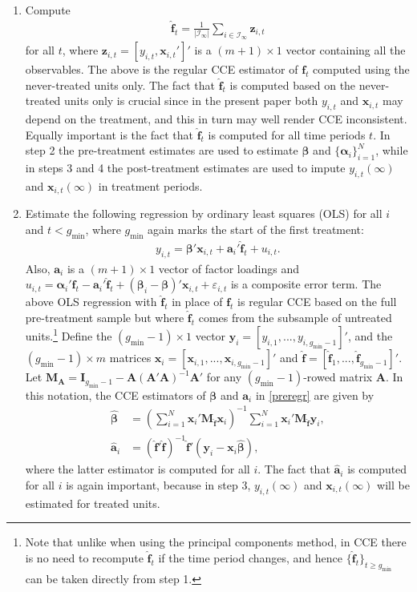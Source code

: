 \documentclass[12pt,fleqn]{article}
\def\*#1{\mathbf{#1}}
\def\+#1{\boldsymbol{#1}}
\begin{document}
\begin{enumerate}
\item Compute
\begin{align}
\widehat{\*f}_t = \frac{1}{|\mathcal{I}_\infty|}\sum_{i \in \mathcal{I}_\infty} \*z_{i,t}  \label{fhat}
\end{align}
for all $t$, where $\*z_{i,t} = [y_{i,t},\*x_{i,t}']'$ is a $(m+1)\times 1$ vector containing all the observables. The above is the regular CCE estimator of $\*f_t$ computed using the never-treated units only. The fact that $\widehat{\*f}_t$ is computed based on the never-treated units only is crucial since in the present paper both $y_{i,t}$ and $\*x_{i,t}$ may depend on the treatment, and this in turn may well render CCE inconsistent. Equally important is the fact that $\widehat{\*f}_t$ is computed for all time periods $t$. In step 2 the pre-treatment estimates are used to estimate $\+\beta$ and $\{\+\alpha_i\}_{i=1}^N$, while in steps 3 and 4 the post-treatment estimates are used to impute $y_{i,t}(\infty)$ and $\*x_{i,t}(\infty)$ in treatment periods.

\item Estimate the following regression by ordinary least squares (OLS) for all $i$ and $t < g_{\min}$, where $g_{\min}$ again marks the start of the first treatment:
\begin{align}
y_{i,t} = \+\beta'\*x_{i,t} + \*a_i'\widehat{\*f}_t + u_{i,t}. \label{preregr}
\end{align}
Also, $\*a_i$ is a $(m+1)\times 1$ vector of factor loadings and $u_{i,t} = \+\alpha_i'\*f_t - \*a_i'\widehat{\*f}_t + (\+\beta_i-\+\beta)'\*x_{i,t} +  \varepsilon_{i,t}$ is a composite error term. The above OLS regression with $\widehat{\*f}_t$ in place of $\*f_t$ is regular CCE based on the full pre-treatment sample but where $\widehat{\*f}_t$ comes from the subsample of untreated units.\footnote{Note that unlike when using the principal components method, in CCE there is no need to recompute $\widehat{\*f}_t$ if the time period changes, and hence $\{\widehat{\*f}_t\}_{t \geq g_{\min}}$ can be taken directly from step 1.} Define the $(g_{\min}-1)\times 1$ vector $\*y_{i} = [y_{i,1},...,y_{i,g_{\min}-1}]'$, and the $(g_{\min}-1)\times m$ matrices $\*x_{i} = [\*x_{i,1},...,\*x_{i,g_{\min}-1}]'$ and $\widehat{\*f} = [\widehat{\*f}_{1},...,\widehat{\*f}_{g_{\min}-1}]'$. Let $\*M_{\*A} = \*I_{g_{\min}-1} - \*A(\*A'\*A)^{-1}\*A'$ for any $(g_{\min}-1)$-rowed matrix $\*A$. In this notation, the CCE estimators of $\+\beta$ and $\*a_i$ in \eqref{preregr} are given by
\begin{align}
\widehat{\+\beta} &= \left(\sum_{i=1}^N  \*x_{i}'\*M_{\widehat{\*f}}\*x_{i}\right)^{-1}\sum_{i=1}^N \*x_{i}' \*M_{\widehat{\*f}}\*y_{i},\\
\widehat{\*a}_i &= (\widehat{\*f}'\widehat{\*f})^{-1}\widehat{\*f}'(\*y_{i}-\*x_{i}\widehat{\+\beta}),
\end{align}
where the latter estimator is computed for all $i$. The fact that $\widehat{\*a}_i$ is computed for all $i$ is again important, because in step 3, $y_{i,t}(\infty)$ and $\*x_{i,t}(\infty)$ will be estimated for treated units.


\end{enumerate}
\end{document}
